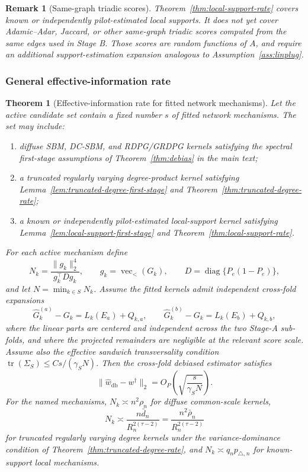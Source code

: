 \documentclass[12pt]{article}
\newtheorem{theorem}{Theorem}
\newtheorem{remark}{Remark}
\newcommand{\1}{\mathbf{1}}
\begin{document}
\begin{remark}[Same-graph triadic scores]
Theorem~\ref{thm:local-support-rate} covers known or independently
pilot-estimated local supports. It does not yet cover Adamic--Adar, Jaccard,
or other same-graph triadic scores computed from the same edges used in Stage
B. Those scores are random functions of \(A\), and require an additional
support-estimation expansion analogous to Assumption~\ref{ass:linplug}.
\end{remark}

\subsubsection{General effective-information rate}

\begin{theorem}[Effective-information rate for fitted network mechanisms]
\label{thm:effective-information-fitted}
Let the active candidate set contain a fixed number \(s\) of fitted network
mechanisms. The set may include:
\begin{enumerate}
    \item diffuse SBM, DC-SBM, and RDPG/GRDPG kernels satisfying the
    spectral first-stage assumptions of Theorem~\ref{thm:debias} in the main text;
    \item a truncated regularly varying degree-product kernel satisfying
    Lemma~\ref{lem:truncated-degree-first-stage} and
    Theorem~\ref{thm:truncated-degree-rate};
    \item a known or independently pilot-estimated local-support kernel
    satisfying Lemma~\ref{lem:local-support-first-stage} and
    Theorem~\ref{thm:local-support-rate}.
\end{enumerate}
For each active mechanism define
\[
    N_k
    =
    \frac{\|g_k\|_2^4}{g_k^\top D g_k},
    \qquad
    g_k=\operatorname{vec}_{<}(G_k),
    \qquad
    D=\operatorname{diag}\{P_e(1-P_e)\},
\]
and let \(N=\min_{k\in S}N_k\). Assume the fitted kernels admit
independent cross-fold expansions
\[
    \widehat G^{(a)}_k-G_k=L_k(E_a)+Q_{k,a},
    \qquad
    \widehat G^{(b)}_k-G_k=L_k(E_b)+Q_{k,b},
\]
where the linear parts are centered and independent across the two Stage-A
sub-folds, and where the projected remainders are negligible at the relevant
score scale. Assume also the effective sandwich transversality condition
\(\operatorname{tr}(\Sigma_S)\le Cs/(\gamma_SN)\). Then the cross-fold
debiased estimator satisfies
\[
    \|\widehat w_{\mathrm{db}}-w^\dagger\|_2
    =
    O_P\!\left(
        \sqrt{\frac{s}{\gamma_SN}}
    \right).
\]
For the named mechanisms, \(N_k\asymp n^2\rho_n\) for diffuse common-scale
kernels,
\[
    N_k
    \asymp
    \frac{n\bar d_n}{R_n^{2(\tau-2)}}
    =
    \frac{n^2\bar\rho_n}{R_n^{2(\tau-2)}}
\]
for truncated regularly varying degree kernels under the variance-dominance
condition of Theorem~\ref{thm:truncated-degree-rate}, and
\(N_k\asymp q_np_{\triangle,n}\) for known-support local mechanisms.
\end{theorem}
\end{document}
